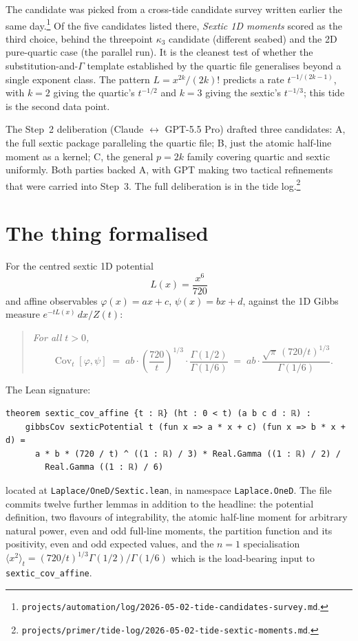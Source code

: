 \documentclass[11pt]{article}
\begin{document}
The candidate was picked from a cross-tide candidate survey written
earlier the same day.\footnote{\texttt{projects/automation/log/}\allowbreak\texttt{2026-05-02-tide-candidates-survey.md}.}
Of the five candidates listed there, \emph{Sextic 1D moments} scored as the
third choice, behind the threepoint $\kappa_3$ candidate (different seabed)
and the 2D pure-quartic case (the parallel run). It is the cleanest test
of whether the substitution-and-$\Gamma$ template established by the
quartic file generalises beyond a single exponent class. The pattern
$L = x^{2k}/(2k)!$ predicts a rate $t^{-1/(2k-1)}$, with $k=2$ giving the
quartic's $t^{-1/2}$ and $k=3$ giving the sextic's $t^{-1/3}$; this tide is
the second data point.

The Step~2 deliberation (Claude $\leftrightarrow$ GPT-5.5 Pro) drafted three
candidates: A, the full sextic package paralleling the quartic file; B,
just the atomic half-line moment as a kernel; C, the general $p = 2k$
family covering quartic and sextic uniformly. Both parties backed A, with
GPT making two tactical refinements that were carried into Step~3. The full
deliberation is in the tide log.\footnote{\texttt{projects/primer/tide-log/}\allowbreak\texttt{2026-05-02-tide-sextic-moments.md}.}

\section{The thing formalised}

For the centred sextic 1D potential
\[
  L(x) = \frac{x^6}{720}
\]
and affine observables $\varphi(x) = ax + c$, $\psi(x) = bx + d$, against the
1D Gibbs measure $e^{-tL(x)}\,dx / Z(t)$:

\begin{quote}\itshape
For all $t > 0$,
\[
  \operatorname{Cov}_t[\varphi,\psi]
  \;=\; ab \cdot \left(\frac{720}{t}\right)^{1/3} \cdot
        \frac{\Gamma(1/2)}{\Gamma(1/6)}
  \;=\; ab \cdot \frac{\sqrt{\pi}\,(720/t)^{1/3}}{\Gamma(1/6)}.
\]
\end{quote}

\noindent The Lean signature:
\begin{verbatim}
theorem sextic_cov_affine {t : ℝ} (ht : 0 < t) (a b c d : ℝ) :
    gibbsCov sexticPotential t (fun x => a * x + c) (fun x => b * x + d) =
      a * b * (720 / t) ^ ((1 : ℝ) / 3) * Real.Gamma ((1 : ℝ) / 2) /
        Real.Gamma ((1 : ℝ) / 6)
\end{verbatim}

\noindent located at \texttt{Laplace/OneD/Sextic.lean}, in namespace
\texttt{Laplace.OneD}. The file commits twelve further lemmas in addition
to the headline: the potential definition, two flavours of integrability,
the atomic half-line moment for arbitrary natural power, even and odd
full-line moments, the partition function and its positivity, even and odd
expected values, and the $n=1$ specialisation
$\langle x^2\rangle_t = (720/t)^{1/3}\Gamma(1/2)/\Gamma(1/6)$ which is the
load-bearing input to \texttt{sextic\_cov\_affine}.
\end{document}

